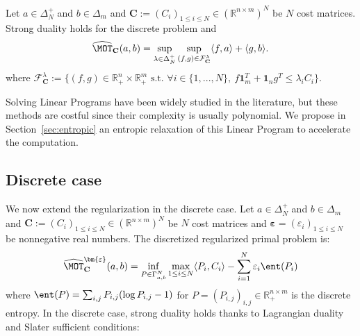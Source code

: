 \begin{prop}
\label{prop:discrete-dual}

Let $a\in\Delta_N^{+}$ and $b\in\Delta_m$ and $\mathbf{C}:=(C_i)_{1\leq i\leq N}\in\left(\mathbb{R}^{n\times m}\right)^N$ be $N$ cost matrices. Strong duality holds for the discrete problem and
\begin{align*}
\widehat{\MOT}_{\mathbf{C}}(a,b)=\sup_{\lambda\in\Delta_N^{+}}\sup\limits_{(f,g)\in\mathcal{F}^{\lambda}_{\mathbf{C}}} \langle f,a\rangle+\langle g,b\rangle.
\end{align*}
where $\mathcal{F}^{\lambda}_{\mathbf{C}}:=\{(f,g)\in\mathbb{R}_{+}^n\times\mathbb{R}_{+}^m\text{ s.t. }\forall i\in\{1,...,N\},~ f\mathbf{1}_m^T+\mathbf{1}_n g^T\leq\lambda_i C_i\}$.
\end{prop}

Solving Linear Programs have been widely studied in the literature, but these methods are costful since their complexity is usually polynomial. We  propose in Section~\ref{sec:entropic}  an entropic relaxation of this Linear Program to accelerate the computation.


\subsection{Discrete case}
We now extend the regularization in the discrete case. 
Let $a\in\Delta_N^{+}$ and $b\in\Delta_m$ and $\mathbf{C}:=(C_i)_{1\leq i\leq N}\in\left(\mathbb{R}^{n\times m}\right)^N$ be $N$ cost matrices and $\bm{\varepsilon}=(\varepsilon_i)_{1\leq i\leq N}$ be nonnegative real numbers. The discretized regularized primal problem is:
\begin{align*}
    \widehat{\MOT}^{\bm{\varepsilon}}_{\mathbf{C}}(a,b)=\inf_{P\in \Gamma_{a,b}^N} \max_{1\leq i\leq N}\langle P_i,C_i\rangle -\sum_{i=1}^N\varepsilon_i \ent(P_i) 
\end{align*}
where $\ent(P) = \sum_{i,j}P_{i,j}(\log P_{i,j}-1)$ for $P=(P_{i,j})_{i,j}\in \mathbb{R}_+^{n\times m}$ is the discrete entropy. In the discrete case, strong duality holds thanks to Lagrangian duality and Slater sufficient conditions:
 
